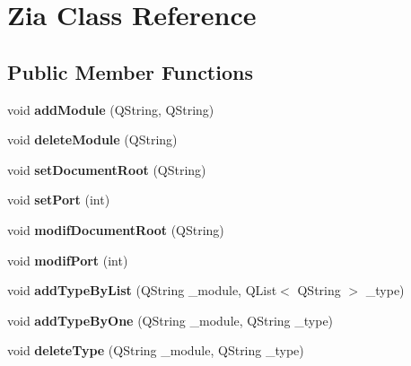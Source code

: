 \hypertarget{class_zia}{
\section{Zia Class Reference}
\label{class_zia}
}
\subsection*{Public Member Functions}
\begin{DoxyCompactItemize}
\item 
\hypertarget{class_zia_a89985973e8a61077be81bb8e52f1b561}{
void {\bfseries addModule} (QString, QString)}
\label{class_zia_a89985973e8a61077be81bb8e52f1b561}

\item 
\hypertarget{class_zia_a143184d0e0e5b230ce01b09c4b5f6604}{
void {\bfseries deleteModule} (QString)}
\label{class_zia_a143184d0e0e5b230ce01b09c4b5f6604}

\item 
\hypertarget{class_zia_add757b78a4d032477a4265680966358a}{
void {\bfseries setDocumentRoot} (QString)}
\label{class_zia_add757b78a4d032477a4265680966358a}

\item 
\hypertarget{class_zia_a92272b44eba95d3b4448decdacb53a65}{
void {\bfseries setPort} (int)}
\label{class_zia_a92272b44eba95d3b4448decdacb53a65}

\item 
\hypertarget{class_zia_aeff84536e61553bef4638c6c56bbef8c}{
void {\bfseries modifDocumentRoot} (QString)}
\label{class_zia_aeff84536e61553bef4638c6c56bbef8c}

\item 
\hypertarget{class_zia_a3009ed54a4cb32d4642a50461ac3a623}{
void {\bfseries modifPort} (int)}
\label{class_zia_a3009ed54a4cb32d4642a50461ac3a623}

\item 
\hypertarget{class_zia_ab7a46d3d492a5c91062f361240ce0c22}{
void {\bfseries addTypeByList} (QString \_\-module, QList$<$ QString $>$ \_\-type)}
\label{class_zia_ab7a46d3d492a5c91062f361240ce0c22}

\item 
\hypertarget{class_zia_a4bfe7ff815f67c92bf422eb22a67f034}{
void {\bfseries addTypeByOne} (QString \_\-module, QString \_\-type)}
\label{class_zia_a4bfe7ff815f67c92bf422eb22a67f034}

\item 
\hypertarget{class_zia_ac1dac746886d728cc9d5e7b7fe385745}{
void {\bfseries deleteType} (QString \_\-module, QString \_\-type)}
\label{class_zia_ac1dac746886d728cc9d5e7b7fe385745}


\end{DoxyCompactItemize}
